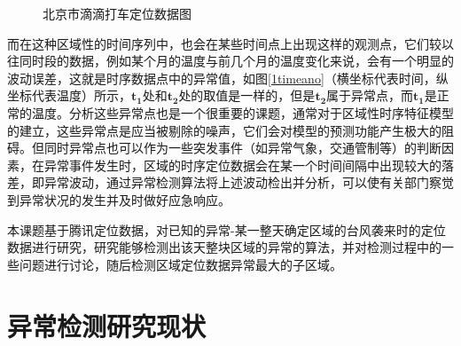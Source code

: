 \documentclass[a4paper,AutoFakeBold,oneside,12pt]{book}
\begin{document}
\begin{figure}[!htbp]
    \centering
    \quad %
    \caption{北京市滴滴打车定位数据图} %
    \label{didi} %
\end{figure}
	而在这种区域性的时间序列中，也会在某些时间点上出现这样的观测点，它们较以往同时段的数据，例如某个月的温度与前几个月的温度变化来说，会有一个明显的波动误差，这就是时序数据点中的异常值，如图\ref{1timeano}（横坐标代表时间，纵坐标代表温度）所示，$\bm{t_1}$处和$\bm{t_2}$处的取值是一样的，但是$\bm{t_2}$属于异常点，而$\bm{t_1}$是正常的温度。分析这些异常点也是一个很重要的课题，通常对于区域性时序特征模型的建立，这些异常点是应当被剔除的噪声，它们会对模型的预测功能产生极大的阻碍。但同时异常点也可以作为一些突发事件（如异常气象，交通管制等）的判断因素，在异常事件发生时，区域的时序定位数据会在某一个时间间隔中出现较大的落差，即异常波动，通过异常检测算法将上述波动检出并分析，可以使有关部门察觉到异常状况的发生并及时做好应急响应。


	本课题基于腾讯定位数据，对已知的异常-某一整天确定区域的台风袭来时的定位数据进行研究，研究能够检测出该天整块区域的异常的算法，并对检测过程中的一些问题进行讨论，随后检测区域定位数据异常最大的子区域。

\section{异常检测研究现状}
\end{document}
